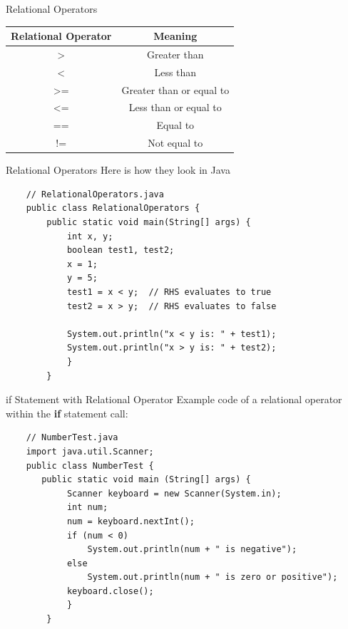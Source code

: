 \documentclass[11pt]{beamer}
\begin{document}
\begin{frame}{Relational Operators}
    \begin{table}[]
    \begin{tabular}{|c|c|}
    \hline
    Relational Operator & Meaning                  \\ \hline
    \textgreater{}      & Greater than             \\ \hline
    \textless{}         & Less than                \\ \hline
    \textgreater{}=     & Greater than or equal to \\ \hline
    \textless{}=        & Less than or equal to    \\ \hline
    ==                  & Equal to                 \\ \hline
    !=                  & Not equal to             \\ \hline
    \end{tabular}
    \end{table}
\end{frame}

\begin{frame}[fragile]{Relational Operators}
    Here is how they look in Java
    \begin{lstlisting}
    // RelationalOperators.java
    public class RelationalOperators {
        public static void main(String[] args) {
            int x, y;
            boolean test1, test2;
            x = 1;
            y = 5;
            test1 = x < y;  // RHS evaluates to true
            test2 = x > y;  // RHS evaluates to false
    
            System.out.println("x < y is: " + test1);
            System.out.println("x > y is: " + test2);
            }
        }
    \end{lstlisting}
\end{frame}

\begin{frame}[fragile]{if Statement with Relational Operator}
    Example code of a relational operator within the \textbf{if} statement call:
    \begin{lstlisting}
    // NumberTest.java
    import java.util.Scanner;
    public class NumberTest {
	   public static void main (String[] args) {
    		Scanner keyboard = new Scanner(System.in);
    		int num;
    		num = keyboard.nextInt();
    		if (num < 0)
    			System.out.println(num + " is negative");
    		else
    			System.out.println(num + " is zero or positive");
    		keyboard.close();
    		}
        }
    \end{lstlisting}
\end{frame}
\end{document}
